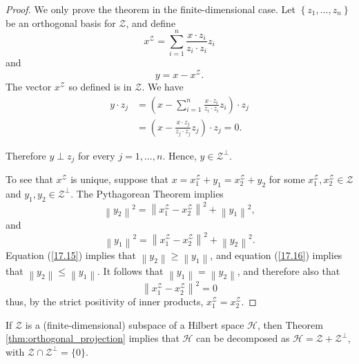 \documentclass[\topdir/lecture\_notes.tex]{subfiles}
\begin{document}
\begin{proof}
We only prove the theorem in the finite-dimensional case. Let $\left\{z_{1}, \ldots, z_{n}\right\}$ be an orthogonal basis for $\mathcal{Z}$, and define
\begin{equation}
x^{\mathcal{Z}}=\sum_{i=1}^{n} \frac{x \cdot z_{i}}{z_{i} \cdot z_{i}} z_{i} \label{17.11}
\end{equation}
and
\begin{equation*}
y=x-x^{\mathcal{Z}}. 
\end{equation*}
The vector $x^{\mathcal{Z}}$ so defined is in $\mathcal{Z}$. We have
\begin{align}
y \cdot z_{j} & =\left(x-\sum_{i=1}^{n} \frac{x \cdot z_{i}}{z_{i} \cdot z_{i}} z_{i}\right) \cdot z_{j} \\
& =\left(x-\frac{x \cdot z_{j}}{z_{j} \cdot z_{j}} z_{j}\right) \cdot z_{j}=0. 
\end{align}

Therefore $y \perp z_{j}$ for every $j=1, \ldots, n$. Hence, $y \in \mathcal{Z}^{\perp}$.

To see that $x^{\mathcal{Z}}$ is unique, suppose that $x=x_{1}^{\mathcal{Z}}+y_{1}=x_{2}^{\mathcal{Z}}+y_{2}$ for some $x_{1}^{\mathcal{Z}}, x_{2}^{\mathcal{Z}} \in \mathcal{Z}$ and $y_{1}, y_{2} \in \mathcal{Z}^{\perp}$. The Pythagorean Theorem implies
\begin{equation}
\left\|y_{2}\right\|^{2}=\left\|x_{1}^{\mathcal{Z}}-x_{2}^{\mathcal{Z}}\right\|^{2}+\left\|y_{1}\right\|^{2}, \label{17.15}
\end{equation}
and
\begin{equation}
\left\|y_{1}\right\|^{2}=\left\|x_{1}^{\mathcal{Z}}-x_{2}^{\mathcal{Z}}\right\|^{2}+\left\|y_{2}\right\|^{2} . \label{17.16}
\end{equation}
Equation (\ref{17.15}) implies that $\left\|y_{2}\right\| \geq\left\|y_{1}\right\|$, and equation (\ref{17.16}) implies that $\left\|y_{2}\right\| \leq\left\|y_{1}\right\|$. It follows that $\left\|y_{1}\right\|=\left\|y_{2}\right\|$, and therefore also that
\begin{equation*}
\left\|x_{1}^{\mathcal{Z}}-x_{2}^{\mathcal{Z}}\right\|^{2}=0 
\end{equation*}
thus, by the strict positivity of inner products, $x_{1}^{\mathcal{Z}}=x_{2}^{\mathcal{Z}}$.
\end{proof}

If $\mathcal{Z}$ is a (finite-dimensional) subspace of a Hilbert space $\mathcal{H}$, then Theorem \ref{thm:orthogonal_projection} implies that $\mathcal{H}$ can be decomposed as $\mathcal{H}=\mathcal{Z}+\mathcal{Z}^{\perp}$, with $\mathcal{Z} \cap \mathcal{Z}^{\perp}=\{0\}$.
\end{document}
